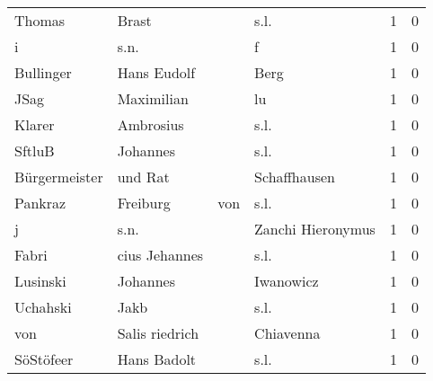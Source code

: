 \begin{center}
\begin{tiny}
\begin{longtabu}{llllrr}
                   Thomas &                              Brast &             &                                        s.l. &          1 &         0 \\
                        i &                               s.n. &             &                                           f &          1 &         0 \\
                Bullinger &                        Hans Eudolf &             &                                        Berg &          1 &         0 \\
                     JSag &                         Maximilian &             &                                          lu &          1 &         0 \\
                   Klarer &                          Ambrosius &             &                                        s.l. &          1 &         0 \\
                   SftluB &                           Johannes &             &                                        s.l. &          1 &         0 \\
            Bürgermeister &                            und Rat &             &                                Schaffhausen &          1 &         0 \\
                  Pankraz &                           Freiburg &         von &                                        s.l. &          1 &         0 \\
                        j &                               s.n. &             &                           Zanchi Hieronymus &          1 &         0 \\
                    Fabri &                      cius Jehannes &             &                                        s.l. &          1 &         0 \\
                 Lusinski &                           Johannes &             &                                   Iwanowicz &          1 &         0 \\
                 Uchahski &                               Jakb &             &                                        s.l. &          1 &         0 \\
                      von &                     Salis riedrich &             &                                   Chiavenna &          1 &         0 \\
                SöStöfeer &                        Hans Badolt &             &                                        s.l. &          1 &         0 \\

\end{longtabu}
\end{tiny}
\end{center}
